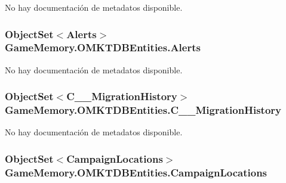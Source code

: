 No hay documentación de metadatos disponible. 

\hypertarget{class_game_memory_1_1_o_m_k_t_d_b_entities_ad09c268d72a208931f255844067f0320}{
\subsubsection[{Alerts}]{\setlength{\rightskip}{0pt plus 5cm}Object\-Set$<${\bf Alerts}$>$ Game\-Memory.\-O\-M\-K\-T\-D\-B\-Entities.\-Alerts\hspace{0.3cm}{\ttfamily [get]}}}\label{class_game_memory_1_1_o_m_k_t_d_b_entities_ad09c268d72a208931f255844067f0320}


No hay documentación de metadatos disponible. 

\hypertarget{class_game_memory_1_1_o_m_k_t_d_b_entities_adba9b579fda9a3066cadb2bc29160848}{
\subsubsection[{C\-\_\-\-\_\-\-Migration\-History}]{\setlength{\rightskip}{0pt plus 5cm}Object\-Set$<${\bf C\-\_\-\-\_\-\-Migration\-History}$>$ Game\-Memory.\-O\-M\-K\-T\-D\-B\-Entities.\-C\-\_\-\-\_\-\-Migration\-History\hspace{0.3cm}{\ttfamily [get]}}}\label{class_game_memory_1_1_o_m_k_t_d_b_entities_adba9b579fda9a3066cadb2bc29160848}


No hay documentación de metadatos disponible. 

\hypertarget{class_game_memory_1_1_o_m_k_t_d_b_entities_af34aeb2775d3c6ec3b02e8cca590efbf}{
\subsubsection[{Campaign\-Locations}]{\setlength{\rightskip}{0pt plus 5cm}Object\-Set$<${\bf Campaign\-Locations}$>$ Game\-Memory.\-O\-M\-K\-T\-D\-B\-Entities.\-Campaign\-Locations\hspace{0.3cm}{\ttfamily [get]}}}\label{class_game_memory_1_1_o_m_k_t_d_b_entities_af34aeb2775d3c6ec3b02e8cca590efbf}


